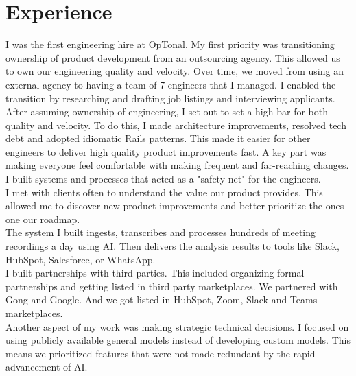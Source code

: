\documentclass[]{matija-resume}
\begin{document}
\begin{minipage}[t]{1.0\textwidth}


\section{Experience}

\vspace{\topsep}
I was the first engineering hire at OpTonal. My first priority was transitioning ownership of product development from an outsourcing agency. This allowed us to own our engineering quality and velocity. Over time, we moved from using an external agency to having a team of 7 engineers that I managed. I enabled the transition by researching and drafting job listings and interviewing applicants.\\
\vspace{\topsep}
After assuming ownership of engineering, I set out to set a high bar for both quality and velocity. To do this, I made architecture improvements, resolved tech debt and adopted idiomatic Rails patterns. This made it easier for other engineers to deliver high quality product improvements fast. A key part was making everyone feel comfortable with making frequent and far-reaching changes. I built systems and processes that acted as a "safety net" for the engineers.\\
\vspace{\topsep}
I met with clients often to understand the value our product provides. This allowed me to discover new product improvements and better prioritize the ones one our roadmap.\\
\vspace{\topsep}
The system I built ingests, transcribes and processes hundreds of meeting recordings a day using AI. Then delivers the analysis results to tools like Slack, HubSpot, Salesforce, or WhatsApp.\\
\vspace{\topsep}
I built partnerships with third parties. This included organizing formal partnerships and getting listed in third party marketplaces. We partnered with Gong and Google. And we got listed in HubSpot, Zoom, Slack and Teams marketplaces.\\
\vspace{\topsep}
Another aspect of my work was making strategic technical decisions. I focused on using publicly available general models instead of developing custom models. This means we prioritized features that were not made redundant by the rapid advancement of AI.\\
\sectionsep


\end{minipage}
\end{document}
